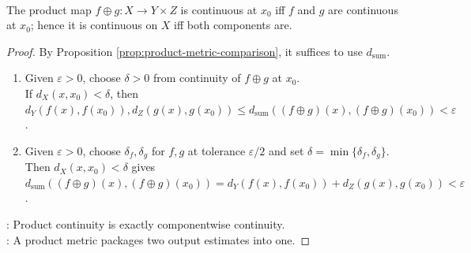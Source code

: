 \begin{proposition} \label{prop:product-map-continuity} \\
The product map $f\oplus g:X\to Y\times Z$ is continuous at $x_0$ iff $f$ and $g$ are continuous at $x_0$; hence it is continuous on $X$ iff both components are.
\begin{proof}
By Proposition \ref{prop:product-metric-comparison}, it suffices to use $d_{\mathrm{sum}}$.
\begin{enumerate}[label=\roman*.]
\setlength{\itemsep}{0pt}
\item[$(\Rightarrow)$] Given $\varepsilon>0$, choose $\delta>0$ from continuity of $f\oplus g$ at $x_0$.\\
If $d_X(x,x_0)<\delta$, then $d_Y(f(x),f(x_0)),d_Z(g(x),g(x_0))\leq d_{\mathrm{sum}}((f\oplus g)(x),(f\oplus g)(x_0))<\varepsilon$.
\item[$(\Leftarrow)$] Given $\varepsilon>0$, choose $\delta_f,\delta_g$ for $f,g$ at tolerance $\varepsilon/2$ and set $\delta=\min\{\delta_f,\delta_g\}$.\\
Then $d_X(x,x_0)<\delta$ gives $d_{\mathrm{sum}}((f\oplus g)(x),(f\oplus g)(x_0))=d_Y(f(x),f(x_0))+d_Z(g(x),g(x_0))<\varepsilon$.
\end{enumerate}
: Product continuity is exactly componentwise continuity.\\
: A product metric packages two output estimates into one.
\end{proof}
\end{proposition}

